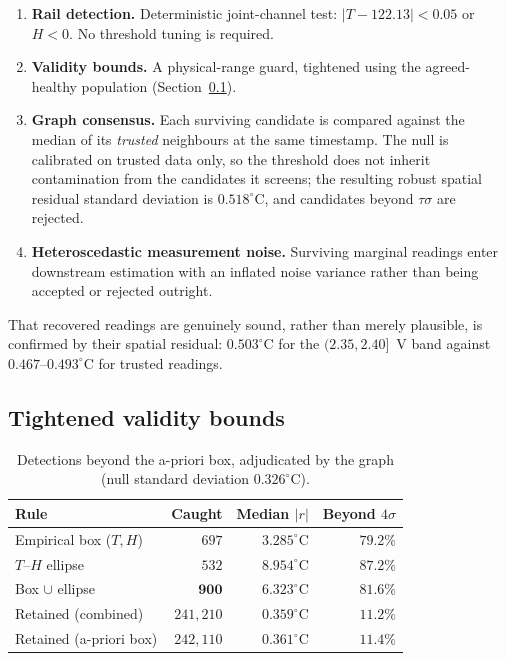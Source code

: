 \documentclass[conference]{IEEEtran}
\begin{document}
\begin{enumerate}
\item[S1] \textbf{Rail detection.} Deterministic joint-channel test:
$|T - 122.13| < 0.05$ or $H < 0$. No threshold tuning is required.
\item[S2] \textbf{Validity bounds.} A physical-range guard, tightened using the
agreed-healthy population (Section~\ref{sec:bounds}).
\item[S3] \textbf{Graph consensus.} Each surviving candidate is compared
against the median of its \emph{trusted} neighbours at the same timestamp. The
null is calibrated on trusted data only, so the threshold does not inherit
contamination from the candidates it screens; the resulting robust spatial
residual standard deviation is $0.518^\circ$C, and candidates beyond
$\tau\sigma$ are rejected.
\item[S4] \textbf{Heteroscedastic measurement noise.} Surviving marginal
readings enter downstream estimation with an inflated noise variance rather
than being accepted or rejected outright.
\end{enumerate}

That recovered readings are genuinely sound, rather than merely plausible, is
confirmed by their spatial residual: $0.503^\circ$C for the $(2.35, 2.40]$~V
band against $0.467$--$0.493^\circ$C for trusted readings.

\subsection{Tightened validity bounds}
\label{sec:bounds}

\begin{table}[t]
\caption{Detections beyond the a-priori box, adjudicated by the graph (null
standard deviation $0.326^\circ$C).}
\label{tab:bounds}
\centering
\begin{tabular}{lrrr}
\toprule
Rule & Caught & Median $|r|$ & Beyond $4\sigma$ \\
\midrule
Empirical box ($T,H$)      & $697$ & $3.285^\circ$C & $79.2\%$ \\
$T$--$H$ ellipse           & $532$ & $8.954^\circ$C & $87.2\%$ \\
Box $\cup$ ellipse         & $\mathbf{900}$ & $6.323^\circ$C & $\mathbf{81.6\%}$ \\
\midrule
Retained (combined)        & $241{,}210$ & $0.359^\circ$C & $11.2\%$ \\
Retained (a-priori box)    & $242{,}110$ & $0.361^\circ$C & $11.4\%$ \\
\bottomrule
\end{tabular}
\end{table}
\end{document}
